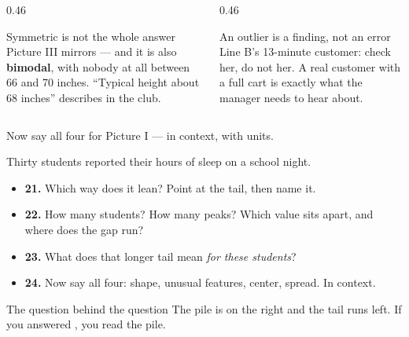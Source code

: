 \documentclass[aspectratio=169, 11pt]{beamer}
\begin{document}
\begin{frame}[t, plain]
  \vspace{8pt}
  \begin{columns}[t]
    \begin{column}{0.46\textwidth}
      \begin{block}{Symmetric is not the whole answer}
        Picture III mirrors --- and it is also \textbf{bimodal}, with nobody at all between
        66 and 70 inches. ``Typical height about 68 inches'' describes  in the
        club.
      \end{block}
    \end{column}
    \begin{column}{0.46\textwidth}
      \begin{block}{An outlier is a finding, not an error}
        Line B's 13-minute customer: check her, do not  her. A real customer
        with a full cart is exactly what the manager needs to hear about.
      \end{block}
    \end{column}
  \end{columns}
  \vspace{14pt}
  \begin{center}
    {\large Now say all four for Picture I --- in context, with units.}
  \end{center}
\end{frame}

\begin{frame}[t, plain]
  Thirty students reported their hours of sleep on a school night.
  \begin{itemize}\setlength{\itemsep}{5pt}
    \item \textbf{21.} Which way does it lean? Point at the tail, then name it.
    \item \textbf{22.} How many students? How many peaks? Which value sits apart, and where
          does the gap run?
    \item \textbf{23.} What does that longer tail mean \emph{for these students}?
    \item \textbf{24.} Now say all four: shape, unusual features, center, spread. In context.
  \end{itemize}
  \begin{block}{The question behind the question}
    The pile is on the right and the tail runs left. If you answered ,
    you read the pile.
  \end{block}
\end{frame}
\end{document}
